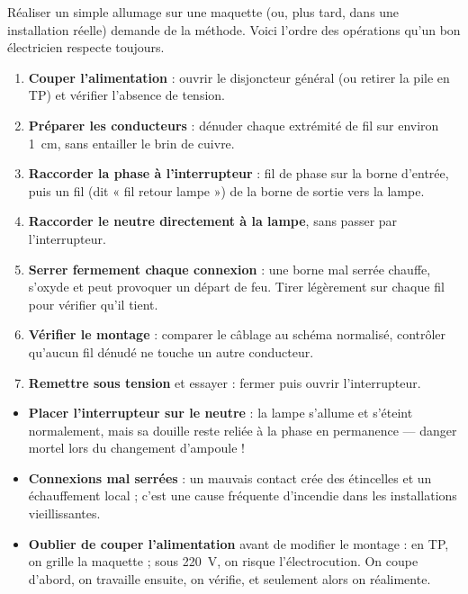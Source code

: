 \documentclass[11pt]{article}
\newcounter{popsec}
\newcounter{popsub}
\newcommand{\courssub}[1]{%
  \stepcounter{popsub}%
  \par\vspace{9pt}\noindent{\popxbold\fontsize{11.5}{13}\selectfont\color{popink}{\color{poporange}\thepopsec.\thepopsub}\hspace{6pt}#1}\par\nopagebreak\vspace{4pt}
}
\begin{document}
\courssub{Réalisation pratique du montage}

Réaliser un simple allumage sur une maquette (ou, plus tard, dans une installation réelle) demande de la méthode. Voici l'ordre des opérations qu'un bon électricien respecte toujours.

\begin{methode}
\begin{enumerate}
\item \textbf{Couper l'alimentation} : ouvrir le disjoncteur général (ou retirer la pile en TP) et vérifier l'absence de tension.
\item \textbf{Préparer les conducteurs} : dénuder chaque extrémité de fil sur environ \SI{1}{cm}, sans entailler le brin de cuivre.
\item \textbf{Raccorder la phase à l'interrupteur} : fil de phase sur la borne d'entrée, puis un fil (dit « fil retour lampe ») de la borne de sortie vers la lampe.
\item \textbf{Raccorder le neutre directement à la lampe}, sans passer par l'interrupteur.
\item \textbf{Serrer fermement chaque connexion} : une borne mal serrée chauffe, s'oxyde et peut provoquer un départ de feu. Tirer légèrement sur chaque fil pour vérifier qu'il tient.
\item \textbf{Vérifier le montage} : comparer le câblage au schéma normalisé, contrôler qu'aucun fil dénudé ne touche un autre conducteur.
\item \textbf{Remettre sous tension} et essayer : fermer puis ouvrir l'interrupteur.
\end{enumerate}
\end{methode}

\begin{attention}
\begin{itemize}
\item \textbf{Placer l'interrupteur sur le neutre} : la lampe s'allume et s'éteint normalement, mais sa douille reste reliée à la phase en permanence — danger mortel lors du changement d'ampoule !
\item \textbf{Connexions mal serrées} : un mauvais contact crée des étincelles et un échauffement local ; c'est une cause fréquente d'incendie dans les installations vieillissantes.
\item \textbf{Oublier de couper l'alimentation} avant de modifier le montage : en TP, on grille la maquette ; sous \SI{220}{V}, on risque l'électrocution. On coupe d'abord, on travaille ensuite, on vérifie, et seulement alors on réalimente.
\end{itemize}
\end{attention}
\end{document}
